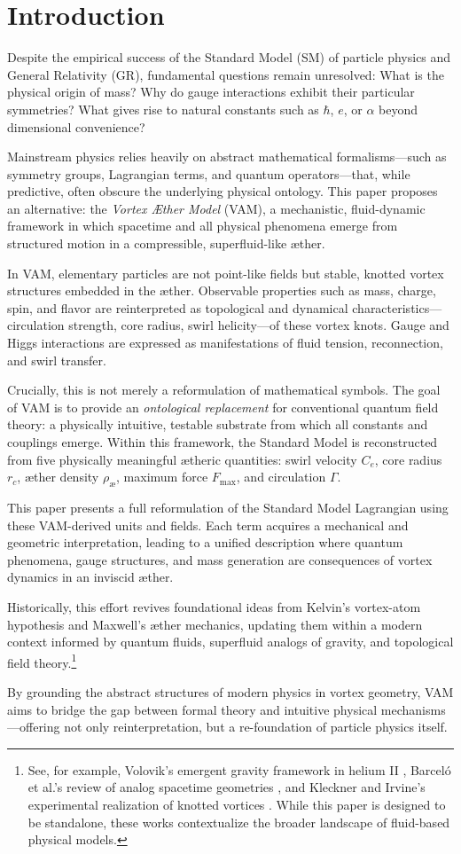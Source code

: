 \section{Introduction}\label{sec:inleiding}

Despite the empirical success of the Standard Model (SM) of particle physics and General Relativity (GR), fundamental questions remain unresolved: What is the physical origin of mass? Why do gauge interactions exhibit their particular symmetries? What gives rise to natural constants such as $\hbar$, $e$, or $\alpha$ beyond dimensional convenience?

Mainstream physics relies heavily on abstract mathematical formalisms—such as symmetry groups, Lagrangian terms, and quantum operators—that, while predictive, often obscure the underlying physical ontology. This paper proposes an alternative: the \emph{Vortex Æther Model} (VAM), a mechanistic, fluid-dynamic framework in which spacetime and all physical phenomena emerge from structured motion in a compressible, superfluid-like æther.

In VAM, elementary particles are not point-like fields but stable, knotted vortex structures embedded in the æther. Observable properties such as mass, charge, spin, and flavor are reinterpreted as topological and dynamical characteristics—circulation strength, core radius, swirl helicity—of these vortex knots. Gauge and Higgs interactions are expressed as manifestations of fluid tension, reconnection, and swirl transfer.

Crucially, this is not merely a reformulation of mathematical symbols. The goal of VAM is to provide an \emph{ontological replacement} for conventional quantum field theory: a physically intuitive, testable substrate from which all constants and couplings emerge. Within this framework, the Standard Model is reconstructed from five physically meaningful ætheric quantities: swirl velocity $C_e$, core radius $r_c$, æther density $\rho_\text{\ae}$, maximum force $F_\text{max}$, and circulation $\Gamma$.

This paper presents a full reformulation of the Standard Model Lagrangian using these VAM-derived units and fields. Each term acquires a mechanical and geometric interpretation, leading to a unified description where quantum phenomena, gauge structures, and mass generation are consequences of vortex dynamics in an inviscid æther.

Historically, this effort revives foundational ideas from Kelvin’s vortex-atom hypothesis and Maxwell’s æther mechanics, updating them within a modern context informed by quantum fluids, superfluid analogs of gravity, and topological field theory.\footnote{See, for example, Volovik’s emergent gravity framework in helium II \cite{Volovik2003UniverseInHelium}, Barceló et al.'s review of analog spacetime geometries \cite{Barcelo2005AnalogueGravityReview}, and Kleckner and Irvine's experimental realization of knotted vortices \cite{Kleckner2013KnottedVortices}. While this paper is designed to be standalone, these works contextualize the broader landscape of fluid-based physical models.}

By grounding the abstract structures of modern physics in vortex geometry, VAM aims to bridge the gap between formal theory and intuitive physical mechanisms—offering not only reinterpretation, but a re-foundation of particle physics itself.
